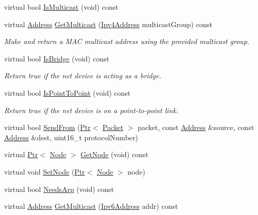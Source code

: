 \begin{DoxyCompactItemize}
\item 
virtual bool \hyperlink{classns3_1_1MmWaveNetDevice_ac63f97398b7caf35963d44c7e1c470bf}{Is\+Multicast} (void) const 
\item 
virtual \hyperlink{classns3_1_1Address}{Address} \hyperlink{classns3_1_1MmWaveNetDevice_a75d9a112fa8e279da52eb12987451072}{Get\+Multicast} (\hyperlink{classns3_1_1Ipv4Address}{Ipv4\+Address} multicast\+Group) const 
\begin{DoxyCompactList}\small\item\em Make and return a M\+AC multicast address using the provided multicast group. \end{DoxyCompactList}\item 
virtual bool \hyperlink{classns3_1_1MmWaveNetDevice_a87e2ecb2ec56bfae121dfe4a451fba00}{Is\+Bridge} (void) const 
\begin{DoxyCompactList}\small\item\em Return true if the net device is acting as a bridge. \end{DoxyCompactList}\item 
virtual bool \hyperlink{classns3_1_1MmWaveNetDevice_a36b705e65e35a2b2b76067306f7dda7f}{Is\+Point\+To\+Point} (void) const 
\begin{DoxyCompactList}\small\item\em Return true if the net device is on a point-\/to-\/point link. \end{DoxyCompactList}\item 
virtual bool \hyperlink{classns3_1_1MmWaveNetDevice_a919e217970671527d07c13799bca68be}{Send\+From} (\hyperlink{classns3_1_1Ptr}{Ptr}$<$ \hyperlink{classns3_1_1Packet}{Packet} $>$ packet, const \hyperlink{classns3_1_1Address}{Address} \&source, const \hyperlink{classns3_1_1Address}{Address} \&dest, uint16\+\_\+t protocol\+Number)
\item 
virtual \hyperlink{classns3_1_1Ptr}{Ptr}$<$ \hyperlink{classns3_1_1Node}{Node} $>$ \hyperlink{classns3_1_1MmWaveNetDevice_a7feb183c8597f46e0cf5e403f7757a11}{Get\+Node} (void) const 
\item 
virtual void \hyperlink{classns3_1_1MmWaveNetDevice_a430b4894c6dfb9296e5ff548a15eec98}{Set\+Node} (\hyperlink{classns3_1_1Ptr}{Ptr}$<$ \hyperlink{classns3_1_1Node}{Node} $>$ node)
\item 
virtual bool \hyperlink{classns3_1_1MmWaveNetDevice_aeefcb4d552ca672585b0e93cf7b944c7}{Needs\+Arp} (void) const 
\item 
virtual \hyperlink{classns3_1_1Address}{Address} \hyperlink{classns3_1_1MmWaveNetDevice_ac5046b96c2d3f3dcacdcbdace5e6bd24}{Get\+Multicast} (\hyperlink{classns3_1_1Ipv6Address}{Ipv6\+Address} addr) const 

\end{DoxyCompactItemize}
